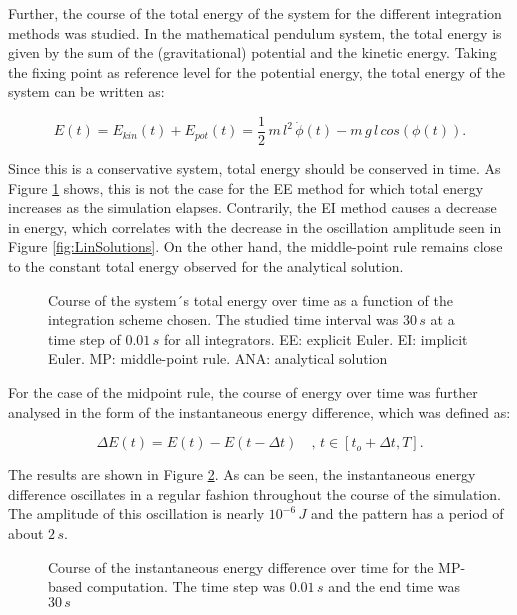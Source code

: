 \documentclass[12pt,bibstyle=none,pagenumberinfooter]{ifmdocument}
\begin{document}
Further, the course of the total energy of the system for the different integration methods was studied. In the mathematical pendulum system, the total energy is given by the sum of the (gravitational) potential and the kinetic energy. Taking the fixing point as reference level for the potential energy, the total energy of the system can be written as:

\begin{equation}
    E(t) = E_{kin}(t) + E_{pot}(t) = \frac{1}{2}\,m\,l^2\,\Dot{\phi}(t) - m\,g\,l\,cos\left(\phi(t)\right).
    \label{eq: energy}
\end{equation}

Since this is a conservative system, total energy should be conserved in time. As Figure \ref{fig: EnergyPlot} shows, this is not the case for the EE method for which total energy increases as the simulation elapses. Contrarily, the EI method causes a decrease in energy, which correlates with the decrease in the oscillation amplitude seen in Figure \ref{fig:LinSolutions}. On the other hand, the middle-point rule remains close to the constant total energy observed for the analytical solution.

\begin{figure}[h]
    \centering
    \setlength{\figH}{0.3\textheight}
    \setlength{\figW}{0.6\textwidth}
    
    \caption{Course of the system´s total energy over time as a function of the integration scheme chosen. The studied time interval was $30\,s$ at a time step of $0.01\,s$ for all integrators. EE: explicit Euler. EI: implicit Euler. MP: middle-point rule. ANA: analytical solution}
    \label{fig: EnergyPlot}
\end{figure}

For the case of the midpoint rule, the course of energy over time was further analysed in the form of the instantaneous energy difference, which was defined as:

\begin{equation}
    \Delta E (t) = E(t) - E(t-\Delta t) \quad ,\,t \in [t_o + \Delta t, T].
\end{equation}


The results are shown in Figure \ref{fig: EnergyDiffPlot}. As can be seen, the instantaneous energy difference oscillates in a regular fashion throughout the course of the simulation. The amplitude of this oscillation is nearly $10^{-6}\,J$ and the pattern has a period of about $2\,s$.


\begin{figure}[h]
    \centering
    \setlength{\figH}{0.3\textheight}
    \setlength{\figW}{0.6\textwidth}
    
    \caption{Course of the instantaneous energy difference over time for the MP-based computation. The time step was $0.01 \,s$ and the end time was $30\,s$}
    \label{fig: EnergyDiffPlot}
\end{figure}
\end{document}
